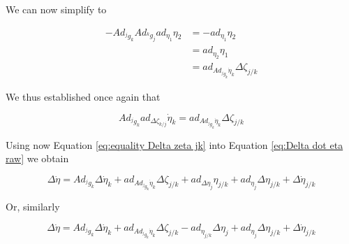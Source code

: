 \documentclass[12pt,a4paper]{book}
\newcommand{\jgk}{\ensuremath{{^j g _k}}}
\renewcommand{\Adjgk}{\ensuremath{Ad_{\jgk}}}
\newcommand{\doteta}{\ensuremath{\dot{\eta}}}
\newcommand{\etajk}{\ensuremath{\eta_{j/k}}}
\begin{document}
We can now simplify to

\begin{equation}
\begin{aligned}
	 - \Adjgk{}  Ad_{^k g _j} ad_{  \eta_1 } \eta_2  	&=  -ad_{  \eta_1 } \eta_2	\\
	 													&= ad_{  \eta_2 } \eta_1	\\
	 													&= ad_{Ad_{^j g _k} \doteta _k} \Delta \zeta _{j/k}
\end{aligned}
\end{equation}

We thus established once again that

\begin{equation}\label{eq:equality Delta zeta jk}
	\Adjgk{} ad_{\Delta \zeta_{k/j}} \doteta _k = ad_{Ad_{^j g _k} \doteta _k} \Delta \zeta _{j/k}
\end{equation}

Using now Equation \eqref{eq:equality Delta zeta jk} into Equation \eqref{eq:Delta dot eta raw} we obtain

\begin{equation}\label{eq:Delta dot eta}
	\Delta \dot{\eta} = \Adjgk \Delta \doteta_k + ad_{Ad_{^j g _k} \doteta _k} \Delta \zeta _{j/k} +    ad_{\Delta \eta_j} \etajk +  ad_{\eta_j} \Delta \etajk + \Delta \dot{\eta}_{j/k}
\end{equation}

Or, similarly

\begin{equation}\label{eq:Delta dot eta}
	\Delta \dot{\eta} = \Adjgk \Delta \doteta_k + ad_{Ad_{^j g _k} \doteta _k} \Delta \zeta _{j/k} - ad_{\etajk}  \Delta \eta_j +  ad_{\eta_j} \Delta \etajk + \Delta \dot{\eta}_{j/k}
\end{equation}



\end{document}
